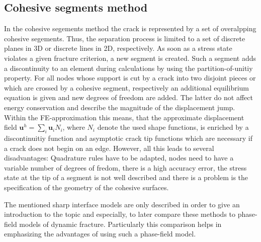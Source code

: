\subsection{Cohesive segments method} \label{sec:intro_cohes}
In the cohesive segements method the crack is represented by a set of overalpping cohesive segements. Thus, the separation process is limited to a set of discrete planes in 3D or discrete lines in 2D, respectively. As soon as a stress state violates a given fracture criterion, a new segment is created. Such a segment adds a discontinuity to an element during calculations by using the partition-of-unitiy property. For all nodes whose support is cut by a crack into two disjoint pieces or which are crossed by a cohesive segment, respectively an additional equilibrium equation is given and new degrees of freedom are added. The latter do not affect energy conservation and describe the magnitude of the displacement jump. Within the FE-approximation this means, that the approximate displacement field $\mathbf{u}^{h}=\sum_{i}\mathbf{u}_{i}N_{i}$, where $N_{i}$ denote the used shape functions, is enriched by a discontinuitiy function and asymptotic crack tip functions which are necessary if a crack does not begin on an edge. However, all this leads to several disadvantages: Quadrature rules have to be adapted, nodes need to have a variable number of degrees of fredom, there is a high accuracy error, the stress state at the tip of a segment is not well described and there is a problem is the specification of the geometry of the cohesive surfaces. \cite{02_SotA_cohes}\cite{01_SotA_cohes_dyn}

The mentioned sharp interface models are only described in order to give an introduction to the topic and especially, to later compare these methods to phase-field models of dynamic fracture. Particularly this comparison helps in emphasizing the advantages of using such a phase-field model. \hl{}





